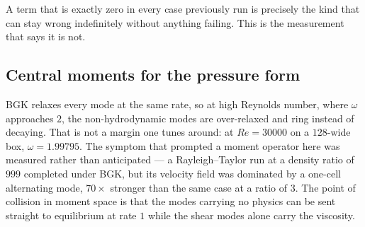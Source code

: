 \documentclass[11pt,a4paper]{article}
\begin{document}
\noindent A term that is exactly zero in every case previously run is precisely
the kind that can stay wrong indefinitely without anything failing. This is the
measurement that says it is not.

\subsection{Central moments for the pressure form}\label{sec:mpcm}

BGK relaxes every mode at the same rate, so at high Reynolds number, where
$\omega$ approaches $2$, the non-hydrodynamic modes are over-relaxed and ring
instead of decaying. That is not a margin one tunes around: at $Re=30000$ on a
$128$-wide box, $\omega=1.99795$. The symptom that prompted a moment operator here
was measured rather than anticipated --- a Rayleigh--Taylor run at a density ratio
of $999$ completed under BGK, but its velocity field was dominated by a one-cell
alternating mode, $70\times$ stronger than the same case at a ratio of $3$. The
point of collision in moment space is that the modes carrying no physics can be
sent straight to equilibrium at rate $1$ while the shear modes alone carry the
viscosity.
\end{document}

